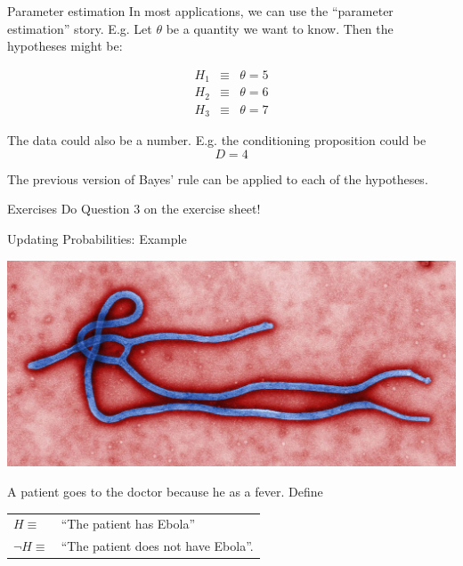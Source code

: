 \documentclass{beamer}
\begin{document}
\begin{frame}[t]{Parameter estimation}
In most applications, we can use the ``parameter estimation'' story. E.g.
Let $\theta$ be a quantity we want to know. Then the hypotheses might be:

\begin{eqnarray}
H_1 &\equiv& \theta = 5\\
H_2 &\equiv& \theta = 6\\
H_3 &\equiv& \theta = 7
\end{eqnarray}

The data could also be a number. E.g. the conditioning proposition could be
\begin{equation}
D = 4
\end{equation}

The previous version of Bayes' rule can be applied to each of the
hypotheses.
\end{frame}

\begin{frame}[t]{Exercises}
Do Question 3 on the exercise sheet!
\end{frame}





\begin{frame}[t]{Updating Probabilities: Example}
\begin{center}
\includegraphics[scale=0.5]{figures/ebola.jpg}
\end{center}
A patient goes to the doctor because he as a fever. Define
\begin{center}
\begin{tabular}{ll}
$H \equiv $ & ``The patient has Ebola''\\
$\neg H \equiv $ & ``The patient does not have Ebola''.
\end{tabular}
\end{center}

\end{frame}
\end{document}
